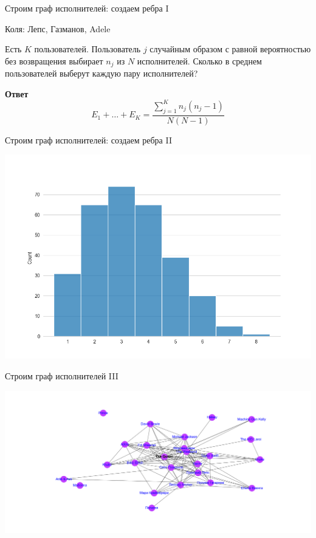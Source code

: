 \documentclass[11pt,aspectratio=169,handout]{beamer}
\begin{document}
\begin{frame}{Строим граф исполнителей: создаем ребра I}

Коля: Лепс, Газманов, Adele

\pause

\begin{center}
\begin{tcolorbox}[colback=vk!5,colframe=vk!70,title=Задача]
Есть $K$ пользователей. Пользователь $j$ случайным образом с равной вероятностью без возвращения выбирает $n_j$ из $N$ исполнителей. Сколько в среднем пользователей выберут каждую пару исполнителей? 
\end{tcolorbox}
\end{center}

\pause

{\bf Ответ}
\[
E_1 + \ldots + E_K = \frac{\sum_{j=1}^K n_j (n_j - 1)}{N (N-1)}
\]
	
\end{frame}

\begin{frame}{Строим граф исполнителей: создаем ребра II}

\begin{center}
\includegraphics[scale=0.4]{images/user_counts.png}
\end{center}

\end{frame}

\begin{frame}{Строим граф исполнителей III}

\begin{center}
\includegraphics[scale=0.35]{images/graph.png}
\end{center}

\end{frame}
\end{document}
